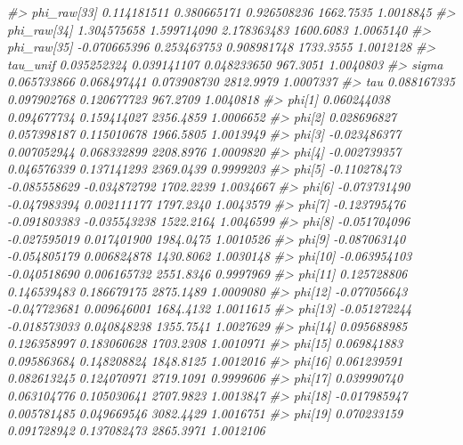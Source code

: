 \documentclass[
]{article}
\newenvironment{Shaded}{\begin{snugshade}}{\end{snugshade}}
\newcommand{\CommentTok}[1]{\textcolor[rgb]{0.56,0.35,0.01}{\textit{#1}}}
\begin{document}
\begin{Shaded}
\begin{Highlighting}[]
\CommentTok{\#\textgreater{} phi\_raw[33]   0.114181511   0.380665171   0.926508236 1662.7535 1.0018845}
\CommentTok{\#\textgreater{} phi\_raw[34]   1.304575658   1.599714090   2.178363483 1600.6083 1.0065140}
\CommentTok{\#\textgreater{} phi\_raw[35]  {-}0.070665396   0.253463753   0.908981748 1733.3555 1.0012128}
\CommentTok{\#\textgreater{} tau\_unif      0.035252324   0.039141107   0.048233650  967.3051 1.0040803}
\CommentTok{\#\textgreater{} sigma         0.065733866   0.068497441   0.073908730 2812.9979 1.0007337}
\CommentTok{\#\textgreater{} tau           0.088167335   0.097902768   0.120677723  967.2709 1.0040818}
\CommentTok{\#\textgreater{} phi[1]        0.060244038   0.094677734   0.159414027 2356.4859 1.0006652}
\CommentTok{\#\textgreater{} phi[2]        0.028696827   0.057398187   0.115010678 1966.5805 1.0013949}
\CommentTok{\#\textgreater{} phi[3]       {-}0.023486377   0.007052944   0.068332899 2208.8976 1.0009820}
\CommentTok{\#\textgreater{} phi[4]       {-}0.002739357   0.046576339   0.137141293 2369.0439 0.9999203}
\CommentTok{\#\textgreater{} phi[5]       {-}0.110278473  {-}0.085558629  {-}0.034872792 1702.2239 1.0034667}
\CommentTok{\#\textgreater{} phi[6]       {-}0.073731490  {-}0.047983394   0.002111177 1797.2340 1.0043579}
\CommentTok{\#\textgreater{} phi[7]       {-}0.123795476  {-}0.091803383  {-}0.035543238 1522.2164 1.0046599}
\CommentTok{\#\textgreater{} phi[8]       {-}0.051704096  {-}0.027595019   0.017401900 1984.0475 1.0010526}
\CommentTok{\#\textgreater{} phi[9]       {-}0.087063140  {-}0.054805179   0.006824878 1430.8062 1.0030148}
\CommentTok{\#\textgreater{} phi[10]      {-}0.063954103  {-}0.040518690   0.006165732 2551.8346 0.9997969}
\CommentTok{\#\textgreater{} phi[11]       0.125728806   0.146539483   0.186679175 2875.1489 1.0009080}
\CommentTok{\#\textgreater{} phi[12]      {-}0.077056643  {-}0.047723681   0.009646001 1684.4132 1.0011615}
\CommentTok{\#\textgreater{} phi[13]      {-}0.051272244  {-}0.018573033   0.040848238 1355.7541 1.0027629}
\CommentTok{\#\textgreater{} phi[14]       0.095688985   0.126358997   0.183060628 1703.2308 1.0010971}
\CommentTok{\#\textgreater{} phi[15]       0.069841883   0.095863684   0.148208824 1848.8125 1.0012016}
\CommentTok{\#\textgreater{} phi[16]       0.061239591   0.082613245   0.124070971 2719.1091 0.9999606}
\CommentTok{\#\textgreater{} phi[17]       0.039990740   0.063104776   0.105030641 2707.9823 1.0013847}
\CommentTok{\#\textgreater{} phi[18]      {-}0.017985947   0.005781485   0.049669546 3082.4429 1.0016751}
\CommentTok{\#\textgreater{} phi[19]       0.070233159   0.091728942   0.137082473 2865.3971 1.0012106}

\end{Highlighting}
\end{Shaded}
\end{document}
